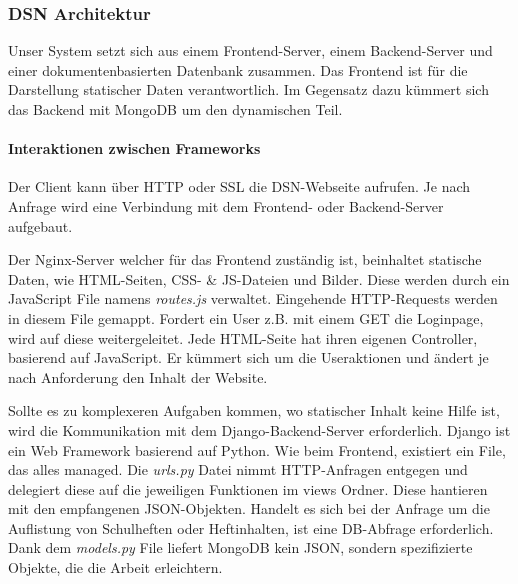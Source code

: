 
\newpage

\subsubsection{DSN Architektur}
Unser System setzt sich aus einem Frontend-Server, einem Backend-Server und einer dokumentenbasierten Datenbank zusammen. Das Frontend ist für die Darstellung statischer Daten verantwortlich. Im Gegensatz dazu kümmert sich das Backend mit MongoDB um den dynamischen Teil.
\paragraph{Interaktionen zwischen Frameworks}

Der Client kann über HTTP oder SSL die DSN-Webseite aufrufen. Je nach Anfrage wird eine Verbindung mit dem Frontend- oder Backend-Server aufgebaut.

Der Nginx-Server welcher für das Frontend zuständig ist, beinhaltet statische Daten, wie HTML-Seiten, CSS- \& JS-Dateien und Bilder. Diese werden durch ein JavaScript File namens \textit{routes.js} verwaltet. Eingehende HTTP-Requests werden in diesem File gemappt. Fordert ein User z.B. mit einem GET die Loginpage, wird auf diese weitergeleitet. Jede HTML-Seite hat ihren eigenen Controller, basierend auf JavaScript. Er kümmert sich um die Useraktionen und ändert je nach Anforderung den Inhalt der Website.


Sollte es zu komplexeren Aufgaben kommen, wo statischer Inhalt keine Hilfe ist, wird die Kommunikation mit dem Django-Backend-Server erforderlich. Django ist ein Web Framework basierend auf Python. Wie beim Frontend, existiert ein File, das alles managed. Die \textit{urls.py} Datei nimmt HTTP-Anfragen entgegen und delegiert diese auf die jeweiligen Funktionen im views Ordner. Diese hantieren mit den empfangenen JSON-Objekten. Handelt es sich bei der Anfrage um die Auflistung von Schulheften oder Heftinhalten, ist eine DB-Abfrage erforderlich.\\
Dank dem \textit{models.py} File liefert MongoDB kein JSON, sondern spezifizierte Objekte, die die Arbeit erleichtern.


